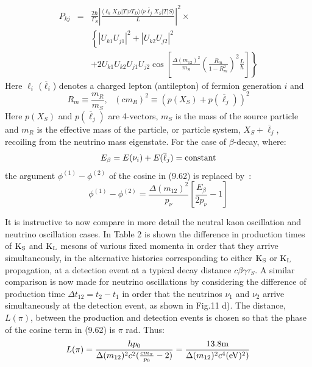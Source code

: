 \documentclass [12pt]{article}
\begin{document}
{\begin{eqnarray}
       P_{k j} & = & \frac{2 \hbar}{\Gamma_{S}}\left|\frac{\langle \ell_k X_D|T|\nu T_D \rangle
        \langle \nu  \overline{\ell}_j X_S|T|S \rangle}{L}\right|^2 \times \nonumber \\   
  &  &  \left\{ |U_{k 1} U_{j 1}|^2+|U_{k 2} U_{j 2}|^2 \right. \nonumber \\ 
  &  &   \left.  +2 U_{k 1}U_{k 2}U_{j 1} U_{j 2}\cos\left[\frac{\Delta(m_{12})^2}{m_S}\left(\frac{R_m}{1-R_m^2}\right)^2
     \frac{L}{\hbar} \right] \right\}   
     \end{eqnarray}
      Here $\ell_i$ ($\overline{\ell}_i$) denotes a charged lepton (antilepton) of fermion generation
     $i$ and 
  \[ R_m \equiv \frac{m_R}{m_S},~~~ (cm_R)^2 \equiv (p(X_S) + p(\overline{\ell}_j))^2 \] 
   Here $p(X_S)$ and $p(\overline{\ell}_j)$ are 4-vectors, $m_S$ is the mass of the source
   particle and $m_R$ is the effective mass of the particle, or particle system, $ X_S+ \overline{\ell}_j$, recoiling
   from the neutrino mass eigenstate. For the case of $\beta$-decay, where:
  \[ E_{\beta} = E(\nu_i) + E(\overline{\ell}_j) = {\rm constant} \]
   the argument $\phi^{(1)}-\phi^{(2)}$ of the cosine in (9.62) is replaced by~\cite{JHF1,JHF2}:
  \begin{equation} 
 \phi^{(1)}-\phi^{(2)} = \frac{\Delta(m_{12})^2}{p_{\nu}}\left[\frac{E_{\beta}}{2p_{\nu}}-1\right]
   \end{equation}
   \par It is instructive to now compare in more detail the neutral kaon oscillation and neutrino 
   oscillation cases. In Table 2 is shown the difference in production times of ${\rm K_S}$ and ${\rm K_L}$ mesons
   of various fixed momenta in order that they arrive simultaneously, in the alternative
    histories corresponding to either ${\rm K_S}$ or ${\rm K_L}$ propagation,  at a detection event at a typical
   decay distance $c \beta \gamma \tau_S$. A similar comparison is now made for neutrino oscillations
   by considering the difference of production time $\Delta t_{12} = t_2-t_1$ in order that the neutrinos
   $\nu_1$ and $\nu_2$ arrive simultaneously at the detection event, as shown in Fig.11 d). 
   The distance, $L(\pi)$, between the production and detection events is chosen so that the 
  phase of the cosine term in (9.62) is $\pi$ rad. Thus:
    \begin{equation}
      L(\pi)  = \frac{h p_0}{\Delta(m_{12})^2 c^2 (\frac{c m_{\pi}}{p_0}-2)} =
      \frac{13.8 \rm{m}}{\Delta(m_{12})^2 c^4 ({\rm eV})^2)}
    \end{equation}
}
\end{document}
